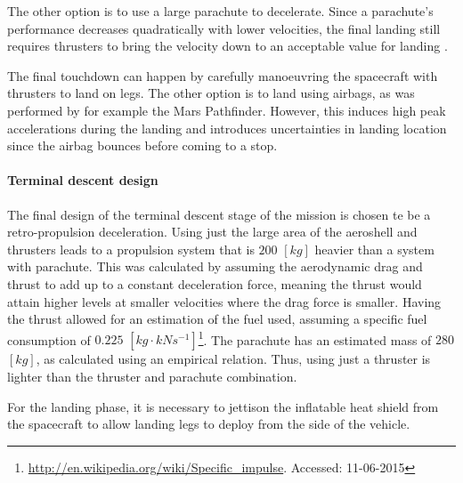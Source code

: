 The other option is to use a large parachute to decelerate. Since a parachute's performance decreases quadratically with lower velocities, the final landing still requires thrusters to bring the velocity down to an acceptable value for landing \cite{Braun2007}.

The final touchdown can happen by carefully manoeuvring the spacecraft with thrusters to land on legs. The other option is to land using airbags, as was performed by for example the Mars Pathfinder. However, this induces high peak accelerations during the landing and introduces uncertainties in landing location since the airbag bounces before coming to a stop.

\paragraph{Terminal descent design}
The final design of the terminal descent stage of the mission is chosen te be a retro-propulsion deceleration. Using just the large area of the aeroshell and thrusters leads to a propulsion system that is $200$ $[kg]$ heavier than a system with parachute. This was calculated by assuming the aerodynamic drag and thrust to add up to a constant deceleration force, meaning the thrust would attain higher levels at smaller velocities where the drag force is smaller. Having the thrust allowed for an estimation of the fuel used, assuming a specific fuel consumption of $0.225$ $[kg \cdot kN s^{-1}]$\footnote{\url{http://en.wikipedia.org/wiki/Specific_impulse}. Accessed: 11-06-2015}. The parachute has an estimated mass of $280$ $[kg]$, as calculated using an empirical relation. Thus, using just a thruster is lighter than the thruster and parachute combination.

For the landing phase, it is necessary to jettison the inflatable heat shield from the spacecraft to allow landing legs to deploy from the side of the vehicle.